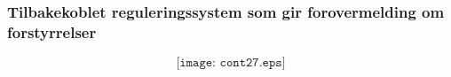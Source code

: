\documentclass{beamer}
\begin{document}
%
%
%
%
%
\begin{frame}
	\frametitle{Tilbakekoblet reguleringssystem som gir forovermelding om forstyrrelser}

	$$\texttt{[image: cont27.eps]}$$
	

\end{frame}
\end{document}
